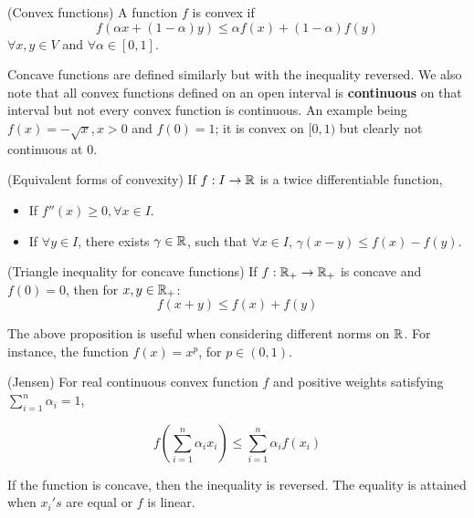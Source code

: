 \documentclass{article}
\begin{document}
\begin{defn}
    (Convex functions) A function $f$ is convex if 
    \begin{equation*}
        f(\alpha x + (1-\alpha)y) \leq \alpha f(x) + (1-\alpha)f(y)
    \end{equation*}
    $\forall x,y \in V$ and $\forall \alpha \in [0,1]$.
\end{defn}

Concave functions are defined similarly but with the inequality reversed. We also note that all convex functions defined
on an open interval is \textbf{continuous} on that interval but not every convex function is continuous. An example being
$f(x) = - \sqrt{x}, x>0$ and $f(0)=1$; it is convex on $[0,1)$ but clearly not continuous at $0$.

\begin{prop}
    (Equivalent forms of convexity) If $f: I \to \mathbb{R}$ is a twice differentiable function,  
    \begin{itemize}
        \item If $f''(x)\geq 0, \forall x \in I$.
        \item If $\forall y \in I$, there exists $\gamma \in \mathbb{R}$, such that $\forall x \in I$, 
                $\gamma (x-y) \leq f(x)-f(y)$.
    \end{itemize}
\end{prop}


\begin{prop}
    (Triangle inequality for concave functions)  
    If $f: \mathbb{R}_+ \to \mathbb{R}_+$ is concave and $f(0)=0$, then for $x,y \in \mathbb{R}_+$:
    \begin{equation*}
        f(x+y) \leq f(x) + f(y)
    \end{equation*}
\end{prop}

The above proposition is useful when considering different norms on $\mathbb{R}$. For instance, the function
$f(x)=x^p$, for $p\in (0,1)$.  

\begin{prop}
(Jensen) 
For real continuous convex function $f$ and positive weights satisfying $\sum_{i=1}^n \alpha_i=1$,  

\begin{equation*}
    f\left(\sum_{i=1}^n \alpha_i x_i\right) \leq \sum_{i=1}^n \alpha_i f(x_i)
\end{equation*}

If the function is concave, then the inequality is reversed.  
The equality is attained when $x_i's$ are equal or $f$ is linear.
\end{prop}
\end{document}
